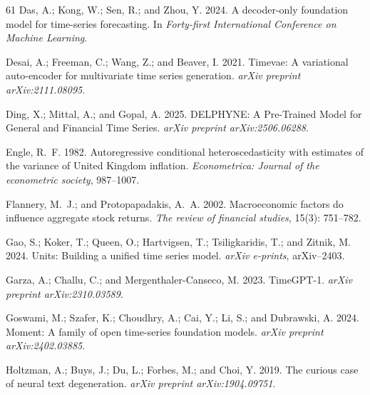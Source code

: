 \documentclass[letterpaper]{article} %
\begin{document}
\begin{thebibliography}{61}
Das, A.; Kong, W.; Sen, R.; and Zhou, Y. 2024.
\newblock A decoder-only foundation model for time-series forecasting.
\newblock In \emph{Forty-first International Conference on Machine Learning}.

Desai, A.; Freeman, C.; Wang, Z.; and Beaver, I. 2021.
\newblock Timevae: A variational auto-encoder for multivariate time series
  generation.
\newblock \emph{arXiv preprint arXiv:2111.08095}.

Ding, X.; Mittal, A.; and Gopal, A. 2025.
\newblock DELPHYNE: A Pre-Trained Model for General and Financial Time Series.
\newblock \emph{arXiv preprint arXiv:2506.06288}.

Engle, R.~F. 1982.
\newblock Autoregressive conditional heteroscedasticity with estimates of the
  variance of United Kingdom inflation.
\newblock \emph{Econometrica: Journal of the econometric society}, 987--1007.

Flannery, M.~J.; and Protopapadakis, A.~A. 2002.
\newblock Macroeconomic factors do influence aggregate stock returns.
\newblock \emph{The review of financial studies}, 15(3): 751--782.

Gao, S.; Koker, T.; Queen, O.; Hartvigsen, T.; Tsiligkaridis, T.; and Zitnik,
  M. 2024.
\newblock Units: Building a unified time series model.
\newblock \emph{arXiv e-prints}, arXiv--2403.

Garza, A.; Challu, C.; and Mergenthaler-Canseco, M. 2023.
\newblock TimeGPT-1.
\newblock \emph{arXiv preprint arXiv:2310.03589}.

Goswami, M.; Szafer, K.; Choudhry, A.; Cai, Y.; Li, S.; and Dubrawski, A. 2024.
\newblock Moment: A family of open time-series foundation models.
\newblock \emph{arXiv preprint arXiv:2402.03885}.

Holtzman, A.; Buys, J.; Du, L.; Forbes, M.; and Choi, Y. 2019.
\newblock The curious case of neural text degeneration.
\newblock \emph{arXiv preprint arXiv:1904.09751}.


\end{thebibliography}
\end{document}
